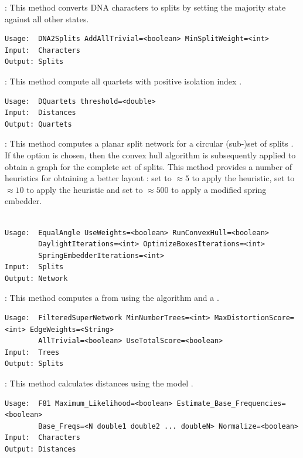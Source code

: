\documentclass[11pt]{article}
\begin{document}
{}:
This method converts DNA characters to splits by setting the
majority state against all other states.
\begin{verbatim}
Usage:  DNA2Splits AddAllTrivial=<boolean> MinSplitWeight=<int>
Input:  Characters
Output: Splits
\end{verbatim}

{}:
This method compute all quartets with positive isolation index
\cite{BandeltDress92}.
\begin{verbatim}
Usage:  DQuartets threshold=<double>
Input:  Distances
Output: Quartets
\end{verbatim}

{}:
This  method computes a planar split network for a circular (sub-)set of
splits \cite{DressHuson2004}.
If the  option is chosen,
then the convex hull algorithm is subsequently applied to obtain a graph for
the complete set of splits.
This method provides a number of heuristics for obtaining a better layout
\cite{GambetteHuson2005}:
set  to $\approx 5$ to apply the  heuristic, set  to $\approx 10$ to
apply the  heuristic and set
 to $\approx 500$ to apply a modified spring
embedder.

\begin{verbatim}

Usage:  EqualAngle UseWeights=<boolean> RunConvexHull=<boolean>
        DaylightIterations=<int> OptimizeBoxesIterations=<int>
        SpringEmbedderIterations=<int>
Input:  Splits
Output: Network
\end{verbatim}

{}:
This method computes a  from  using the
 algorithm \cite{zclosure} and a 
\cite{HusonSteelWhitfield2006}.
\begin{verbatim}
Usage:  FilteredSuperNetwork MinNumberTrees=<int> MaxDistortionScore=<int> EdgeWeights=<String>
        AllTrivial=<boolean> UseTotalScore=<boolean>
Input:  Trees
Output: Splits
\end{verbatim}


{}:
This method calculates distances using the  model
\cite{SOWH1996}.
\begin{verbatim}
Usage:  F81 Maximum_Likelihood=<boolean> Estimate_Base_Frequencies=<boolean>
        Base_Freqs=<N double1 double2 ... doubleN> Normalize=<boolean>
Input:  Characters
Output: Distances
\end{verbatim}
\end{document}
